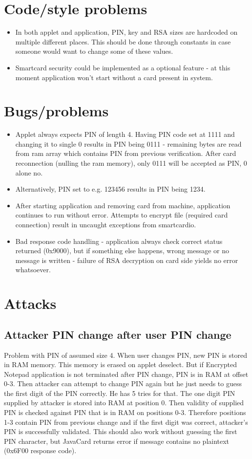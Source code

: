 \documentclass[letterpaper]{article}
\begin{document}
\section{Code/style problems}
\begin{itemize}
\item In both applet and application, PIN, key and RSA sizes are hardcoded on multiple different places. This should be done through constants in case someone would want to change some of these values.
\item Smartcard security could be implemented as a optional feature - at this moment application won't start without a card present in system.
\end{itemize}

\section{Bugs/problems}
\begin{itemize}
\item Applet always expects PIN of length 4. Having PIN code set at 1111 and changing it to single 0 results in PIN being 0111 - remaining bytes are read from ram array which contains PIN from previous verification. After card reconnection (nulling the ram memory), only 0111 will be accepted as PIN, 0 alone no.
\item Alternatively, PIN set to e.g. 123456 results in PIN being 1234.
\item After starting application and removing card from machine, application continues to run without error. Attempts to encrypt file (required card connection) result in uncaught exceptions from smartcardio.
\item Bad response code handling - application always check correct status returned (0x9000), but if something else happens, wrong message or no message is written - failure of RSA decryption on card side yields no error whatsoever.
\end{itemize}

\section{Attacks}
\subsection{Attacker PIN change after user PIN change}
Problem with PIN of assumed size 4. When user changes PIN, new PIN is stored in RAM memory. This memory is erased on applet deselect. But if Encrypted Notepad application is not terminated after PIN change, PIN is in RAM at offset 0-3. Then attacker can attempt to change PIN again but he just needs to guess the first digit of the PIN correctly. He has 5 tries for that. The one digit PIN supplied by attacker is stored into RAM at position 0. Then validity of supplied PIN is checked against PIN that is in RAM on positions 0-3. Therefore positions 1-3 contain PIN from previous change and if the first digit was correct, attacker's PIN is successfully validated. This should also work without guessing the first PIN character, but JavaCard returns error if message contains no plaintext (0x6F00 response code).
\end{document}
